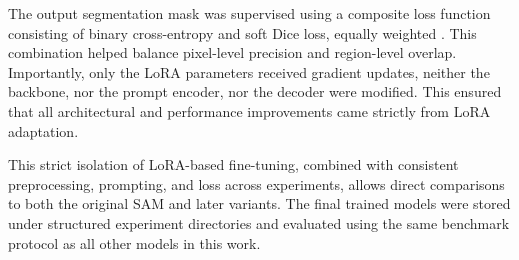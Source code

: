 The output segmentation mask was supervised using a composite loss function consisting of binary cross-entropy and soft Dice loss, equally weighted \cite{Galdran_2022}. This combination helped balance pixel-level precision and region-level overlap. Importantly, only the \gls{LoRA} parameters received gradient updates, neither the backbone, nor the prompt encoder, nor the decoder were modified. This ensured that all architectural and performance improvements came strictly from \gls{LoRA} adaptation.

This strict isolation of \gls{LoRA}-based fine-tuning, combined with consistent preprocessing, prompting, and loss across experiments, allows direct comparisons to both the original \gls{SAM} and later variants. The final trained models were stored under structured experiment directories and evaluated using the same benchmark protocol as all other models in this work.



